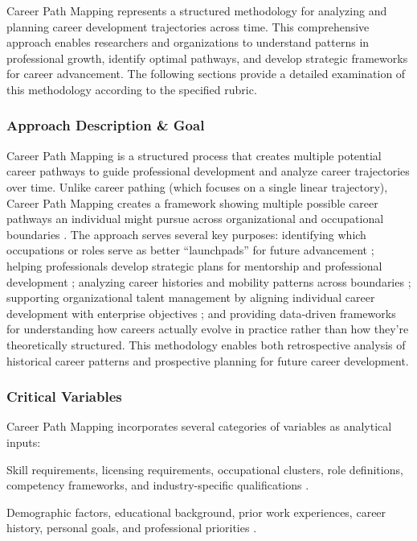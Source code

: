 \documentclass[../main.tex]{subfiles}
\begin{document}
Career Path Mapping represents a structured methodology for analyzing and planning career development trajectories across time. This comprehensive approach enables researchers and organizations to understand patterns in professional growth, identify optimal pathways, and develop strategic frameworks for career advancement. The following sections provide a detailed examination of this methodology according to the specified rubric.

\subsubsection{Approach Description \& Goal}
Career Path Mapping is a structured process that creates multiple potential career pathways to guide professional development and analyze career trajectories over time. Unlike career pathing (which focuses on a single linear trajectory), Career Path Mapping creates a framework showing multiple possible career pathways an individual might pursue across organizational and occupational boundaries \parencite{chronus2023}. The approach serves several key purposes: identifying which occupations or roles serve as better ``launchpads'' for future advancement \parencite{workforcegps2023}; helping professionals develop strategic plans for mentorship and professional development \parencite{ncsu2023}; analyzing career histories and mobility patterns across boundaries \parencite{joseph2012}; supporting organizational talent management by aligning individual career development with enterprise objectives \parencite{chronus2023}; and providing data-driven frameworks for understanding how careers actually evolve in practice rather than how they're theoretically structured. This methodology enables both retrospective analysis of historical career patterns and prospective planning for future career development.

\subsubsection{Critical Variables}
Career Path Mapping incorporates several categories of variables as analytical inputs:

Skill requirements, licensing requirements, occupational clusters, role definitions, competency frameworks, and industry-specific qualifications \parencite{workforcegps2023}.

Demographic factors, educational background, prior work experiences, career history, personal goals, and professional priorities \parencite{workforcegps2023,hireed2021}.
\end{document}
